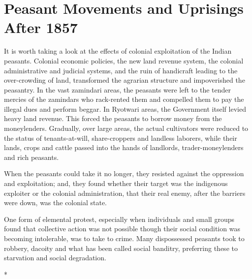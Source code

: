 \chapter{Peasant Movements and Uprisings After 1857}
\begin{multicols}{2}

It is worth taking a look at the effects of colonial exploitation of the Indian peasants. Colonial economic policies, the new land revenue system, the colonial administrative and judicial systems, and the ruin of handicraft leading to the over-crowding of land, transformed the agrarian structure and impoverished the peasantry. In the vast zamindari areas, the peasants were left to the tender mercies of the zamindars who rack-rented them and compelled them to pay the illegal dues and perform beggar. In Ryotwari areas, the Government itself levied heavy land revenue. This forced the peasants to borrow money from the moneylenders. Gradually, over large areas, the actual cultivators were reduced to the status of tenants-at-will, share-croppers and landless laborers, while their lands, crops and cattle passed into the hands of landlords, trader-moneylenders and rich peasants.

When the peasants could take it no longer, they resisted against the oppression and exploitation; and, they found whether their target was the indigenous exploiter or the colonial administration, that their real enemy, after the barriers were down, was the colonial state.

One form of elemental protest, especially when individuals and small groups found that collective action was not possible though their social condition was becoming intolerable, was to take to crime. Many dispossessed peasants took to robbery, dacoity and what has been called social banditry, preferring these to starvation and social degradation.

\begin{center}*\end{center}


\end{multicols}
